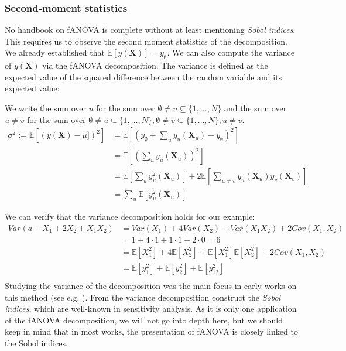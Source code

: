 \subsubsection*{Second-moment statistics}
No handbook on fANOVA is complete without at least mentioning \textit{Sobol indices}. This requires us to observe the second moment statistics of the decomposition. We already established that $\mathbb{E}[y(\boldsymbol{X})] = y_{\emptyset}$.
We can also compute the variance of $y(\boldsymbol{X})$ via the fANOVA decomposition. The variance is defined as the expected value of the squared difference between the random variable and its expected value:

We write the sum over $u$ for the sum over $\emptyset \neq u \subseteq \{1, \dots, N\}$ and the sum over $u \neq v$ for the sum over $\emptyset \neq u \subseteq \{1, \dots, N\}, \emptyset \neq v \subseteq \{1, \dots, N\}, u \neq v$.
\begin{align*}
    \sigma^2 := \mathbb{E}[(y(\boldsymbol{X}) - \mu])^2]
    &= \mathbb{E}[(y_{\emptyset} + \sum_{u} y_u({\boldsymbol{X}_u}) - y_{\emptyset})^2] \\
    &= \mathbb{E}[(\sum_{u} y_u({\boldsymbol{X}_u}))^2] \\
    &= \mathbb{E}[\sum_{u} y_u^2({\boldsymbol{X}_u})] + 2 \mathbb{E}[\sum_{u \neq v} y_u({\boldsymbol{X}_u})  y_v({\boldsymbol{X}_v})] \\
    & = \sum_{u} \mathbb{E}[y_u^2({\boldsymbol{X}_u})]
\end{align*}

We can verify that the variance decomposition holds for our example:
\begin{align*}
    Var(a + X_1 + 2X_2 + X_1 X_2) &= Var(X_1) + 4Var(X_2) + Var(X_1X_2) + 2Cov(X_1, X_2) \\
    &= 1 + 4 \cdot 1 + 1 \cdot 1 + 2 \cdot 0 = 6 \\
    &= \mathbb{E}[X_1^2] + 4\mathbb{E}[X_2^2] + \mathbb{E}[X_1^2]\mathbb{E}[X_2^2] + 2Cov(X_1, X_2) \\
    &= \mathbb{E}[y_1^2] + \mathbb{E}[y_2^2] + \mathbb{E}[y_{12}^2] \\
\end{align*}
Studying the variance of the decomposition was the main focus in early works on this method (see e.g. \cite{sobol1993sensitivity}).
From the variance decomposition \cite{sobol1993sensitivity} construct the \textit{Sobol indices}, which are well-known in sensitivity analysis. As it is only one application of the fANOVA decomposition, we will not go into depth here, but we should keep in mind that in most works, the presentation of fANOVA is closely linked to the Sobol indices.








